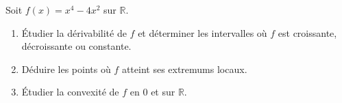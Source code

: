 \begin{exercice}
Soit \( f(x) = x^4 - 4x^2 \) sur \( \mathbb{R} \).
\begin{enumerate}
    \item Étudier la dérivabilité de \( f \) et déterminer les intervalles où \( f \) est croissante, décroissante ou constante.
    \item Déduire les points où \( f \) atteint ses extremums locaux.
    \item Étudier la convexité de \( f \) en \( 0 \) et sur \( \mathbb{R} \).
\end{enumerate}
\end{exercice}
